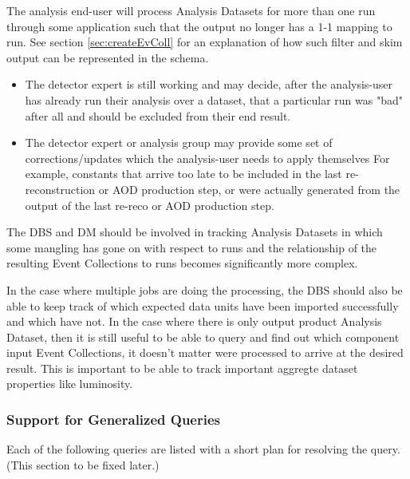 \documentclass{cmspaper}
\begin{document}
  The analysis end-user will process Analysis Datasets for more
than one run through some application such that the output no longer has
a 1-1 mapping to run. See section \ref{sec:createEvColl} for an 
explanation of how such filter and skim output can be 
represented in the schema.
\begin{itemize}
\item The detector expert is still working and may decide, after the 
     analysis-user has already run their analysis over a dataset, that a
     particular run was "bad" after all and should be excluded from their
     end result. 
\item The detector expert or analysis group may provide some set of
     corrections/updates which the analysis-user needs to apply themselves
     For example, constants that arrive too late to be included in 
     the last re-reconstruction or AOD production step, or were 
     actually generated from the output of
     the last re-reco or AOD production step. 
\end{itemize}
The DBS and DM should be involved in tracking Analysis Datasets in which
some mangling has gone on with respect to runs and the relationship of 
the resulting Event Collections to runs becomes significantly more complex.

In the case 
where multiple jobs are doing the processing, the DBS should also be able
to keep track of which expected data units have been imported successfully and which 
have not.  In the case where there is only output product Analysis Dataset, 
then it is still useful to be able to query and find out which component
input Event Collections, it doesn't matter were processed to 
arrive at the desired result.  This is important to be able to track important 
aggregte dataset properties like luminosity.

\subsubsection{Support for Generalized Queries}


Each of the following queries are listed with a short plan for resolving the query.
(This section to be fixed later.) 
\end{document}
